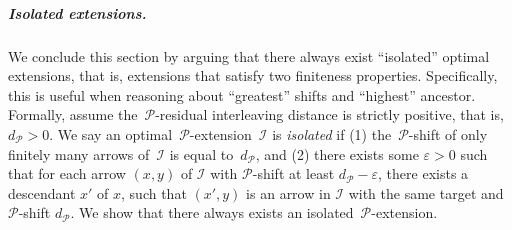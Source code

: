 \documentclass[a4paper,UKenglish, autoref, thm-restate, cleveref]{lipics-v2021}
\newcommand{\resdist}[1]{d_{#1}}
\newcommand{\eps}{\varepsilon}
\newcommand{\I}{\mathcal{I}}
\renewcommand{\P}{\mathcal{P}}
\begin{document}
\subparagraph{Isolated extensions.}
We conclude this section by arguing that there always exist ``isolated'' optimal extensions, that is, extensions that satisfy two finiteness properties.
Specifically, this is useful when reasoning about ``greatest'' shifts and ``highest'' ancestor.
Formally, assume the~$\P$-residual interleaving distance is strictly positive, that is,~$\resdist{\P} > 0$.
We say an optimal~$\P$-extension~$\I$ is \emph{isolated} if (1) the~$\P$-shift of only finitely many arrows of~$\I$ is equal to~$\resdist{\P}$, and (2) there exists some $\eps>0$ such that for each arrow $(x,y)$ of $\I$ with $\P$-shift at least $\resdist{\P}-\eps$, there exists a descendant $x'$ of $x$, such that $(x',y)$ is an arrow in $\I$ with the same target and $\P$-shift $\resdist{\P}$.
We show that there always exists an isolated~$\P$-extension.
\end{document}
